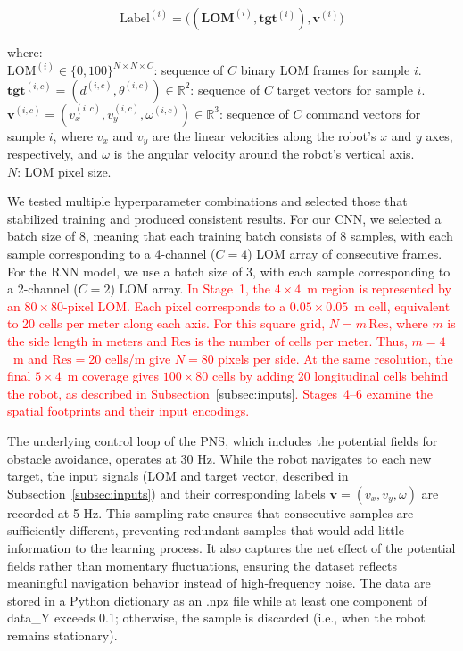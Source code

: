 \documentclass[robotics,article,submit,pdftex,moreauthors]{Definitions/mdpi}
\begin{document}
\begin{equation}
\text{Label}^{(i)} = \big((\mathbf{LOM}^{(i)}, \mathbf{tgt}^{(i)}), \mathbf{v}^{(i)}\big)
\label{train_labels}
\end{equation}

where:\\
$\text{LOM}^{(i)} \in \{0, 100\}^{N \times N \times C}$: sequence of $C$ binary LOM frames for sample $i$.\\
$\mathbf{tgt}^{(i,c)} = (d^{(i,c)}, \theta^{(i,c)}) \in \mathbb{R}^{2}$: sequence of $C$ target vectors for sample $i$.\\
$\mathbf{v}^{(i,c)} = (v_x^{(i,c)}, v_y^{(i,c)}, \omega^{(i,c)}) \in \mathbb{R}^{3}$: sequence of $C$ command vectors for sample $i$, where $v_x$ and $v_y$ are the linear velocities along the robot's $x$ and $y$ axes, respectively, and $\omega$ is the angular velocity around the robot's vertical axis.\\
$N$: LOM pixel size.

We tested multiple hyperparameter combinations and selected those that stabilized training and produced consistent results. For our CNN, we selected a batch size of 8, meaning that each training batch consists of 8 samples, with each sample corresponding to a 4-channel ($C = 4$) LOM array of consecutive frames. For the RNN model, we use a batch size of 3, with each sample corresponding to a 2-channel ($C= 2$) LOM array. \textcolor{red}{In Stage~1, the $4\times4$~m region is represented by an $80\times80$-pixel LOM. Each pixel corresponds to a $0.05\times0.05$~m cell, equivalent to 20 cells per meter along each axis. For this square grid, $N=m\,\mathrm{Res}$, where $m$ is the side length in meters and $\mathrm{Res}$ is the number of cells per meter. Thus, $m=4$~m and $\mathrm{Res}=20$ cells/m give $N=80$ pixels per side. At the same resolution, the final $5\times4$~m coverage gives $100\times80$ cells by adding 20 longitudinal cells behind the robot, as described in Subsection~\ref{subsec:inputs}. Stages~4--6 examine the spatial footprints and their input encodings.}

The underlying control loop of the PNS, which includes the potential fields for obstacle avoidance, operates at 30 Hz. While the robot navigates to each new target, the input signals (LOM and target vector, described in Subsection~\ref{subsec:inputs}) and their corresponding labels $\mathbf{v} = (v_x, v_y, \omega)$ are recorded at 5 Hz. This sampling rate ensures that consecutive samples are sufficiently different, preventing redundant samples that would add little information to the learning process. It also captures the net effect of the potential fields rather than momentary fluctuations, ensuring the dataset reflects meaningful navigation behavior instead of high‑frequency noise. The data are stored in a Python dictionary as an .npz file while at least one component of data\_Y exceeds 0.1; otherwise, the sample is discarded (i.e., when the robot remains stationary).
\end{document}
